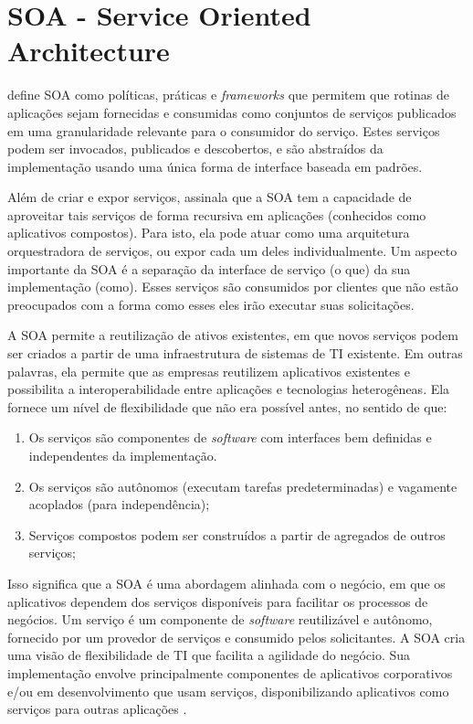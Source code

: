 \section{SOA - Service Oriented Architecture}\label{sec:soa}

 define SOA como políticas, práticas e \textit{frameworks} que permitem que rotinas de aplicações sejam fornecidas e consumidas como conjuntos de serviços publicados em uma granularidade relevante para o consumidor do serviço. Estes serviços podem ser invocados, publicados e descobertos, e são abstraídos da implementação usando uma única forma de interface baseada em padrões.

Além de criar e expor serviços,  assinala que a SOA tem a capacidade de aproveitar tais serviços de forma recursiva em aplicações (conhecidos como aplicativos compostos). Para isto, ela pode atuar como uma arquitetura orquestradora de serviços, ou expor cada um deles individualmente. Um aspecto importante da SOA é a separação da interface de serviço (o que) da sua implementação (como). Esses serviços são consumidos por clientes que não estão preocupados com a forma como esses eles irão executar suas solicitações.

 A SOA permite a reutilização de ativos existentes, em que novos serviços podem ser criados a partir de uma infraestrutura de sistemas de TI existente. Em outras palavras, ela permite que as empresas reutilizem aplicativos existentes e possibilita a interoperabilidade entre aplicações e tecnologias heterogêneas. Ela fornece um nível de flexibilidade que não era possível antes, no sentido de que:

 \begin{enumerate}[label=\alph*)]
    \item Os serviços são componentes de \textit{software} com interfaces bem definidas e independentes da implementação.
    \item Os serviços são autônomos (executam tarefas predeterminadas) e vagamente acoplados (para independência);
    \item Serviços compostos podem ser construídos a partir de agregados de outros serviços;
\end{enumerate}

Isso significa que a SOA é uma abordagem alinhada com o negócio, em que os aplicativos dependem dos serviços disponíveis para facilitar os processos de negócios. Um serviço é um componente de \textit{software} reutilizável e autônomo, fornecido por um provedor de serviços e consumido pelos solicitantes. A SOA cria uma visão de flexibilidade de TI que facilita a agilidade do negócio. Sua implementação envolve principalmente componentes de aplicativos corporativos e/ou em desenvolvimento que usam serviços, disponibilizando aplicativos como serviços para outras aplicações \cite{soa-book}.

